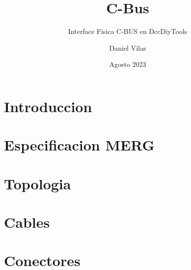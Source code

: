 \documentclass[spanish]{DccDiyTools/DccDiyTools}
\title{C-Bus}
\subtitle{Interface Fisica C-BUS en DccDiyTools}
\author{Daniel Vilas}
\date{Agosto 2023}
\begin{document}
\maketitle
\newpage
\section{Introduccion}

\section{Especificacion MERG}
\section{Topologia}


\section{Cables}
\section{Conectores}
\end{document}
